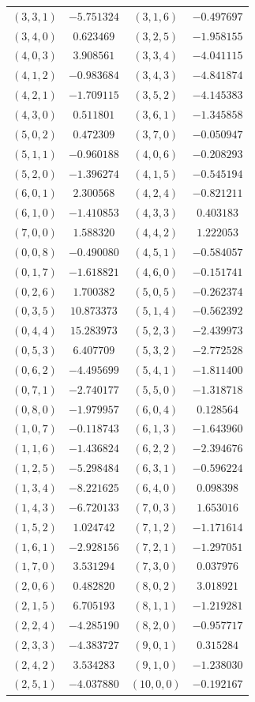 \begin{table}
\begin{tabular}{cc@{\qquad}cc}
$(3,3,1)$ & $-5.751324$ & $(3,1,6)$ & $-0.497697$ \\
$(3,4,0)$ & $0.623469$ & $(3,2,5)$ & $-1.958155$ \\
$(4,0,3)$ & $3.908561$ & $(3,3,4)$ & $-4.041115$ \\
$(4,1,2)$ & $-0.983684$ & $(3,4,3)$ & $-4.841874$ \\
$(4,2,1)$ & $-1.709115$ & $(3,5,2)$ & $-4.145383$ \\
$(4,3,0)$ & $0.511801$ & $(3,6,1)$ & $-1.345858$ \\
$(5,0,2)$ & $0.472309$ & $(3,7,0)$ & $-0.050947$ \\
$(5,1,1)$ & $-0.960188$ & $(4,0,6)$ & $-0.208293$ \\
$(5,2,0)$ & $-1.396274$ & $(4,1,5)$ & $-0.545194$ \\
$(6,0,1)$ & $2.300568$ & $(4,2,4)$ & $-0.821211$ \\
$(6,1,0)$ & $-1.410853$ & $(4,3,3)$ & $0.403183$ \\
$(7,0,0)$ & $1.588320$ & $(4,4,2)$ & $1.222053$ \\
$(0,0,8)$ & $-0.490080$ & $(4,5,1)$ & $-0.584057$ \\
$(0,1,7)$ & $-1.618821$ & $(4,6,0)$ & $-0.151741$ \\
$(0,2,6)$ & $1.700382$ & $(5,0,5)$ & $-0.262374$ \\
$(0,3,5)$ & $10.873373$ & $(5,1,4)$ & $-0.562392$ \\
$(0,4,4)$ & $15.283973$ & $(5,2,3)$ & $-2.439973$ \\
$(0,5,3)$ & $6.407709$ & $(5,3,2)$ & $-2.772528$ \\
$(0,6,2)$ & $-4.495699$ & $(5,4,1)$ & $-1.811400$ \\
$(0,7,1)$ & $-2.740177$ & $(5,5,0)$ & $-1.318718$ \\
$(0,8,0)$ & $-1.979957$ & $(6,0,4)$ & $0.128564$ \\
$(1,0,7)$ & $-0.118743$ & $(6,1,3)$ & $-1.643960$ \\
$(1,1,6)$ & $-1.436824$ & $(6,2,2)$ & $-2.394676$ \\
$(1,2,5)$ & $-5.298484$ & $(6,3,1)$ & $-0.596224$ \\
$(1,3,4)$ & $-8.221625$ & $(6,4,0)$ & $0.098398$ \\
$(1,4,3)$ & $-6.720133$ & $(7,0,3)$ & $1.653016$ \\
$(1,5,2)$ & $1.024742$ & $(7,1,2)$ & $-1.171614$ \\
$(1,6,1)$ & $-2.928156$ & $(7,2,1)$ & $-1.297051$ \\
$(1,7,0)$ & $3.531294$ & $(7,3,0)$ & $0.037976$ \\
$(2,0,6)$ & $0.482820$ & $(8,0,2)$ & $3.018921$ \\
$(2,1,5)$ & $6.705193$ & $(8,1,1)$ & $-1.219281$ \\
$(2,2,4)$ & $-4.285190$ & $(8,2,0)$ & $-0.957717$ \\
$(2,3,3)$ & $-4.383727$ & $(9,0,1)$ & $0.315284$ \\
$(2,4,2)$ & $3.534283$ & $(9,1,0)$ & $-1.238030$ \\
$(2,5,1)$ & $-4.037880$ & $(10,0,0)$ & $-0.192167$ \\
\hline
\end{tabular}
\end{table}
